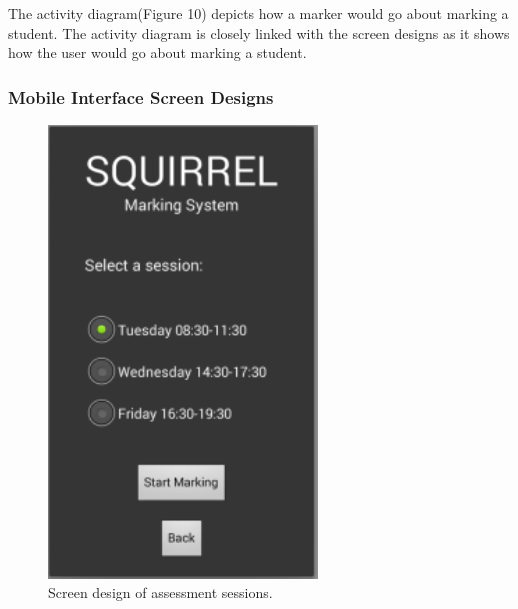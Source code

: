 \documentclass[12pt]{article}
\begin{document}
		The activity diagram(Figure 10) depicts how a marker would go about marking a student. The activity diagram is closely linked with the screen designs as it shows how the user would go about marking a student.
	\pagebreak
	
	\subsubsection{Mobile Interface Screen Designs}
	
			\begin{figure}[htbp]
			\centering
			\includegraphics[width=0.7\linewidth, height=12cm]{./Diagrams/mobile_selectSession}
			\caption{Screen design of assessment sessions.}
			\label{fig:mobile_selectSession}
			\end{figure}
			
	\pagebreak		
		
\end{document}
